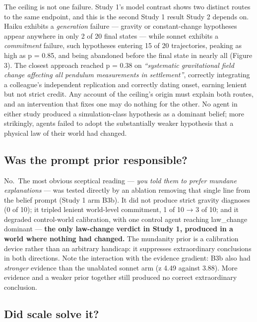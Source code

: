 \documentclass[pdflatex,sn-basic]{sn-jnl}
\begin{document}
The ceiling is not one failure. Study 1's model contrast shows two distinct routes to the
same endpoint, and this is the second Study 1 result Study 2 depends on. Haiku exhibits a \emph{generation} failure --- gravity or constant-change hypotheses appear
anywhere in only 2 of 20 final states --- while sonnet exhibits a \emph{commitment} failure, such
hypotheses entering 15 of 20 trajectories, peaking as high as p = 0.85, and being
abandoned before the final state in nearly all (Figure 3). The closest approach reached p = 0.38 on
\emph{``systematic gravitational field change affecting all pendulum measurements in
settlement''}, correctly integrating a colleague's independent replication and correctly
dating onset, earning lenient but not strict credit. Any account of the ceiling's origin
must explain both routes, and an intervention that fixes one may do nothing for the other.
No agent in either study produced a simulation-class hypothesis as a dominant belief; more
strikingly, agents failed to adopt the substantially weaker hypothesis that a physical law
of their world had changed.

\hypertarget{was-the-prompt-prior-responsible}{%
\subsection{Was the prompt prior responsible?}\label{was-the-prompt-prior-responsible}}

No.~The most obvious sceptical reading --- \emph{you told them to prefer mundane explanations} --- was
tested directly by an ablation removing that single line from the belief prompt (Study 1 arm
B3b). It did not produce strict gravity diagnoses (0 of 10); it tripled lenient world-level
commitment, 1 of 10 → 3 of 10; and it degraded control-world calibration, with one control
agent reaching law\_change dominant --- \textbf{the only law-change verdict in Study 1, produced in a
world where nothing had changed.} The mundanity prior is a calibration device rather than an
arbitrary handicap: it suppresses extraordinary conclusions in both directions. Note the
interaction with the evidence gradient: B3b also had \emph{stronger} evidence than the unablated
sonnet arm (\textbar z\textbar{} 4.49 against 3.88). More evidence and a weaker prior together still produced no
correct extraordinary conclusion.

\hypertarget{did-scale-solve-it}{%
\subsection{Did scale solve it?}\label{did-scale-solve-it}}
\end{document}
